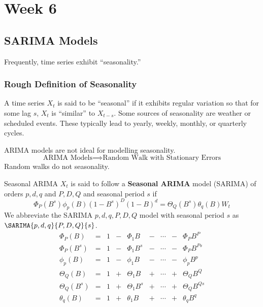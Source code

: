 \chapter{Week 6}
\section{SARIMA Models}
Frequently, time series exhibit ``seasonality.''
\subsection*{Rough Definition of Seasonality}
A time series $ X_t $ is said to be ``seasonal''
if it exhibits regular variation so that for some lag $ s $,
$ X_t $ is ``similar'' to $ X_{t-s} $.
Some sources of seasonality are weather or scheduled events.
These typically lead to yearly, weekly, monthly, or quarterly cycles.
\begin{Remark}{}{}
      ARIMA models are not ideal for modelling seasonality.
      \[ \text{ARIMA Models}\implies\text{Random Walk with Stationary Errors} \]
      Random walks do not seasonality.
\end{Remark}
\begin{Definition}{Seasonal ARIMA}{}
      $ X_t $ is said to follow a \textbf{Seasonal ARIMA} model (SARIMA)
      of orders $ p,d,q $ and $ P,D,Q $ and seasonal period $ s $
      if
      \[ \Phi_P(B^s)\phi_p(B)(1-B^s)^D(1-B)^d=\Theta_Q(B^s)\theta_q(B)W_t \]
      We abbreviate the SARIMA $ p,d,q,P,D,Q $ model with seasonal
      period $ s $ as $ \SARIMA{p,d,q}{P,D,Q}{s} $.
      \[ \begin{array}{ccccccccc}
                  \Phi_P(B)     & = & 1 & - & \Phi_1 B     & - & \cdots & - & \Phi_P B^P      \\
                  \Phi_P(B^s)   & = & 1 & - & \Phi_1 B^s   & - & \cdots & - & \Phi_P B^{Ps}   \\
                  \phi_p(B)     & = & 1 & - & \phi_1 B     & - & \cdots & - & \phi_p B^p      \\
                  \Theta_Q(B)   & = & 1 & + & \Theta_1 B   & + & \cdots & + & \Theta_Q B^Q    \\
                  \Theta_Q(B^s) & = & 1 & + & \Theta_1 B^s & + & \cdots & + & \Theta_Q B^{Qs} \\
                  \theta_q(B)   & = & 1 & + & \theta_1 B   & + & \cdots & + & \theta_q B^q    \\
            \end{array} \]
\end{Definition}
